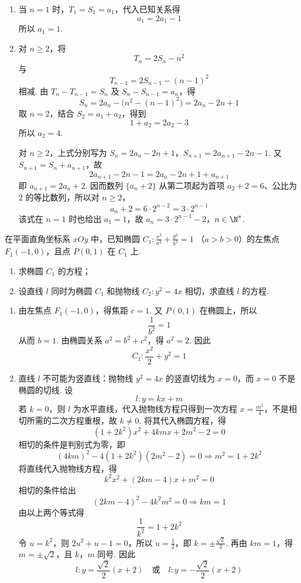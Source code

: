 \begin{solution}
\begin{enumerate}
\item 当 \(n=1\) 时，\(T_1=S_1=a_1\)，代入已知关系得
\[
a_1=2a_1-1
\]
所以 \(a_1=1\).
\item 对 \(n\geqslant2\)，将
\[
T_n=2S_n-n^2
\]
与
\[
T_{n-1}=2S_{n-1}-(n-1)^2
\]
相减. 由 \(T_n-T_{n-1}=S_n\) 及 \(S_n-S_{n-1}=a_n\)，得
\[
S_n=2a_n-\bigl(n^2-(n-1)^2\bigr)=2a_n-2n+1
\]
取 \(n=2\)，结合 \(S_2=a_1+a_2\)，得到
\[
1+a_2=2a_2-3
\]
所以 \(a_2=4\).

对 \(n\geqslant2\)，上式分别写为
\(S_n=2a_n-2n+1\)，\(S_{n+1}=2a_{n+1}-2n-1\).
又 \(S_{n+1}=S_n+a_{n+1}\)，故
\[
2a_{n+1}-2n-1=2a_n-2n+1+a_{n+1}
\]
即 \(a_{n+1}=2a_n+2\). 因而数列 \(\{a_n+2\}\) 从第二项起为首项 \(a_2+2=6\)、公比为 \(2\) 的等比数列，所以对 \(n\geqslant2\)，
\[
a_n+2=6\cdot2^{n-2}=3\cdot2^{n-1}
\]
该式在 \(n=1\) 时也给出 \(a_1=1\)，故
\(a_n=3\cdot2^{n-1}-2\)，\(n\in\N^*\).
\end{enumerate}
\end{solution}

\begin{problem}
在平面直角坐标系 \(xOy\) 中，已知椭圆 \(C_1: \frac{x^2}{a^2} + \frac{y^2}{b^2} = 1\) （\(a > b > 0\)）的左焦点 \(F_1(-1,0)\)，且点 \(P(0,1)\) 在 \(C_1\) 上.
\begin{enumerate}
\item 求椭圆 \(C_1\) 的方程；
\item 设直线 \(l\) 同时为椭圆 \(C_1\) 和抛物线 \(C_2: y^2 = 4x\) 相切，求直线 \(l\) 的方程.
\end{enumerate}
\end{problem}

\begin{solution}
\begin{enumerate}
\item 由左焦点 \(F_1(-1,0)\)，得焦距 \(c=1\). 又 \(P(0,1)\) 在椭圆上，所以
\[
\frac{1}{b^2}=1
\]
从而 \(b=1\). 由椭圆关系 \(a^2=b^2+c^2\)，得 \(a^2=2\). 因此
\[
C_1:\frac{x^2}{2}+y^2=1
\]
\item 直线 \(l\) 不可能为竖直线：抛物线 \(y^2=4x\) 的竖直切线为 \(x=0\)，而 \(x=0\) 不是椭圆的切线. 设
\[
l:y=kx+m
\]
若 \(k=0\)，则 \(l\) 为水平直线，代入抛物线方程只得到一次方程 \(x=\frac{m^2}{4}\)，不是相切所需的二次方程重根，故 \(k\ne0\). 将其代入椭圆方程，得
\[
(1+2k^2)x^2+4kmx+2m^2-2=0
\]
相切的条件是判别式为零，即
\[
(4km)^2-4(1+2k^2)(2m^2-2)=0
\Longrightarrow m^2=1+2k^2
\]
将直线代入抛物线方程，得
\[
k^2x^2+(2km-4)x+m^2=0
\]
相切的条件给出
\[
(2km-4)^2-4k^2m^2=0
\Longrightarrow km=1
\]
由以上两个等式得
\[
\frac1{k^2}=1+2k^2
\]
令 \(u=k^2\)，则 \(2u^2+u-1=0\)，所以 \(u=\frac12\)，即 \(k=\pm\frac{\sqrt2}{2}\). 再由 \(km=1\)，得 \(m=\pm\sqrt2\)，且 \(k\)，\(m\) 同号. 因此
\[
l:y=\frac{\sqrt2}{2}(x+2)
\quad\text{或}\quad
l:y=-\frac{\sqrt2}{2}(x+2)
\]
\end{enumerate}
\end{solution}

